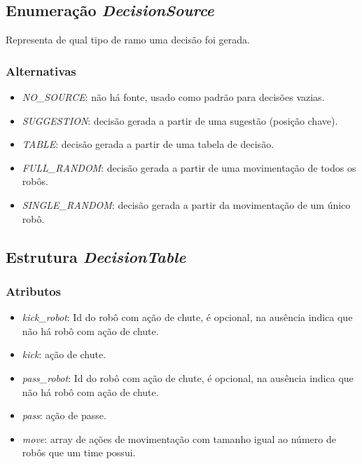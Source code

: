\subsection*{Enumeração \textit{DecisionSource}}

Representa de qual tipo de ramo uma decisão foi gerada.

\subsubsection*{Alternativas}

\begin{itemize}
  \item \textit{NO_SOURCE}: não há fonte, usado como padrão para decisões
    vazias.
  \item \textit{SUGGESTION}: decisão gerada a partir de uma sugestão (posição
    chave).
  \item \textit{TABLE}: decisão gerada a partir de uma tabela de decisão.
  \item \textit{FULL_RANDOM}: decisão gerada a partir de uma movimentação de
    todos os robôs.
  \item \textit{SINGLE_RANDOM}: decisão gerada a partir da movimentação de um
    único robô.
\end{itemize}

\subsection*{Estrutura \textit{DecisionTable}}

\subsubsection*{Atributos}

\begin{itemize}
  \item \textit{kick_robot}: Id do robô com ação de chute, é opcional, na
    ausência indica que não há robô com ação de chute.
  \item \textit{kick}: ação de chute.
  \item \textit{pass_robot}: Id do robô com ação de chute, é opcional, na
    ausência indica que não há robô com ação de chute.
  \item \textit{pass}: ação de passe.
  \item \textit{move}: array de ações de movimentação com tamanho igual ao
    número de robôs que um time possui.
\end{itemize}

